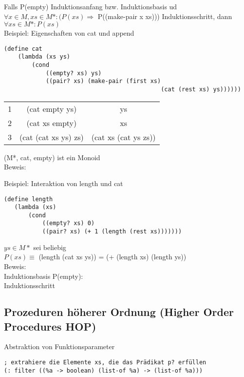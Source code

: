 \documentclass[paper=a4, fontsize=11pt]{scrartcl}
\numberwithin{equation}{section}
\numberwithin{figure}{section}
\numberwithin{table}{section}
\begin{document}
\begin{lstlistig}
 Falls P(empty) Induktionsanfang bzw. Induktionsbasis ud $\forall x \in M, xs \in M*: (P(xs) \Rightarrow $ P((make-pair x xs))) Induktionsschritt, dann $\forall xs \in M*: P(xs)$ \\
 
 Beispiel: Eigenschaften von cat und append
\begin{lstlisting}
(define cat
    (lambda (xs ys)
        (cond
            ((empty? xs) ys)
            ((pair? xs) (make-pair (first xs)
                                             (cat (rest xs) ys))))))
\end{lstlisting}

\begin{tabular}{ccc}
1 & (cat empty ys) & ys\\
2 & (cat xs empty) & xs \\
3 & (cat (cat xs ys) zs) & (cat xs (cat ys zs)) \\
\end{tabular}
 
 (M*, cat, empty) ist ein Monoid \\
 
 Beweis: \\
 \hfill \box
 
 Beispiel: Interaktion von length und cat
\begin{lstlisting}
(define length
   (lambda (xs)
       (cond
           ((empty? xs) 0)
           ((pair? xs) (+ 1 (length (rest xs)))))))
\end{lstlisting}

$ys \in M*$ sei beliebig \\
$P(xs) \equiv$ (length (cat xs ys)) = (+ (length xs) (length ys)) \\

Beweis: \\ 
Induktionsbasis P(empty): \\

Induktionsschritt


\hfill \box
\subsection{Prozeduren höherer Ordnung (Higher Order Procedures HOP)}
Abstraktion von Funktionsparameter \\
\begin{lstlisting}
; extrahiere die Elemente xs, die das Prädikat p? erfüllen
(: filter ((%a -> boolean) (list-of %a) -> (list-of %a)))


\end{lstlisting}
\end{lstlistig}
\end{document}

